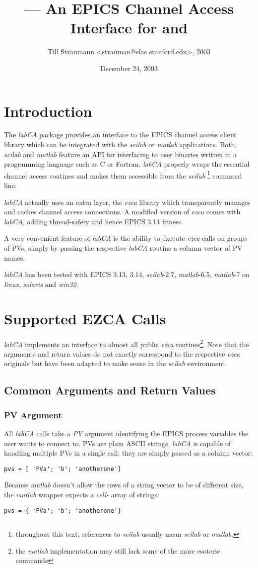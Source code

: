 \documentclass{article}
\title{\sca{} --- An EPICS Channel Access Interface for \scilab{} and \matlab{}}
\author{Till Straumann <strauman@slac.stanford.edu>, 2003}
\date{December 24, 2003}
\newcommand{\sca}{\ita{labCA}}
\newcommand{\scilab}{\ita{scilab}}
\newcommand{\matlab}{\ita{matlab}}
\newcommand{\windoze}{\ita{win32}}
\newcommand{\ezca}{\ita{ezca}}
\newcommand{\ita}[1]{\emph{#1}}
\begin{document}
\maketitle
{\hspace*{\fill}{\small\verb$Id: manual.tex,v 1.13 2004/01/09 04:09:55 till Exp $}\hspace*{\fill}}
\section{Introduction}
The \sca{} package provides an interface to the
EPICS channel access client library which can be
integrated with the \scilab{} or \matlab{} applications.
Both, \scilab{} and \matlab{} feature an API for interfacing
to user binaries written in a programming language such
as C or Fortran. \sca{} properly wraps the essential
channel access routines and makes them accessible
from the \scilab%
\footnote{throughout this text, references to \scilab{}
usually mean \scilab{} or \matlab.}
command line.

\sca{} actually uses an extra layer, the \ezca{} library
which transparently manages and caches channel access 
connections. A modified version of \ezca{} comes with
\sca, adding thread-safety and hence EPICS 3.14 fitness.

A very convenient feature of \sca{} is the ability
to execute \ezca{} calls on groups of PVs, simply by
passing the respective \sca{} routine a column vector
of PV names.

\sca{} has been tested with EPICS 3.13, 3.14, \scilab-2.7,
\matlab-6.5, \matlab-7 on \ita{linux}, \ita{solaris} and
\windoze.

\section{Supported EZCA Calls}
\sca{} implements an interface to almost all public
\ezca{} routines\footnote{%
the \matlab{} implementation may still lack some of the
more esoteric commands}. Note that the arguments and
return values do not exactly correspond to the respective
\ezca{} originals but have been adapted to make sense
in the  \scilab{} environment.

\subsection{Common Arguments and Return Values}
\subsubsection{PV Argument}
All \sca{} calls take a \ita{PV} argument identifying
the EPICS process variables the user wants to connect to.
PVs are plain ASCII strings. \sca{} is capable of handling
multiple PVs in a single call; they are simply passed as a
column vector:
\begin{verbatim}
pvs = [ 'PVa'; 'b'; 'anotherone']
\end{verbatim}
Because \matlab{} doesn't allow the rows of
a string vector to be of different size, the \matlab{}
wrapper expects a \ita{cell-} array of strings:
\begin{verbatim}
pvs = { 'PVa'; 'b'; 'anotherone'}
\end{verbatim}
\end{document}
